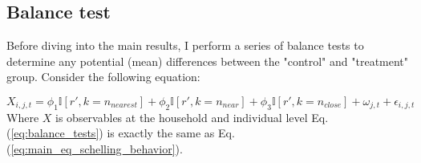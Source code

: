 \documentclass[main.tex]{subfiles}
\begin{document}
\subsection{Balance test}

Before diving into the main results, I perform a series of balance tests to determine any potential (mean) differences between the "control" and "treatment" group. Consider the following equation:

\begin{equation}
    X_{i, j, t} = \phi_1 \mathbb{I}[r', k=n_{nearest}] + \phi_2 \mathbb{I}[r', k = n_{near}] + \phi_3 \mathbb{I}[r', k = n_{close}] + \omega_{j, t} + \epsilon_{i, j, t} 
    \label{eq:balance_tests}
\end{equation}
Where $X$ is observables at the household and individual level Eq. (\ref{eq:balance_tests}) is exactly the same as Eq. (\ref{eq:main_eq_schelling_behavior}). 
\end{document}
